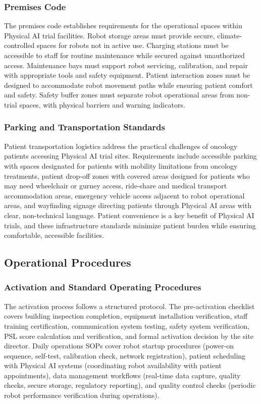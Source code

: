 \clearpage

\subsubsection{Premises Code}

The premises code establishes requirements for the operational spaces within
Physical AI trial facilities. Robot storage areas must provide secure,
climate-controlled spaces for robots not in active use. Charging stations must
be accessible to staff for routine maintenance while secured against
unauthorized access. Maintenance bays must support robot servicing, calibration,
and repair with appropriate tools and safety equipment. Patient interaction
zones must be designed to accommodate robot movement paths while ensuring
patient comfort and safety. Safety buffer zones must separate robot operational
areas from non-trial spaces, with physical barriers and warning indicators.

\subsubsection{Parking and Transportation Standards}

Patient transportation logistics address the practical challenges of oncology
patients accessing Physical AI trial sites. Requirements include accessible
parking with spaces designated for patients with mobility limitations from
oncology treatments, patient drop-off zones with covered areas designed for
patients who may need wheelchair or gurney access, ride-share and medical
transport accommodation areas, emergency vehicle access adjacent to robot
operational areas, and wayfinding signage directing patients through Physical
AI areas with clear, non-technical language. Patient convenience is a key
benefit of Physical AI trials, and these infrastructure standards minimize
patient burden while ensuring comfortable, accessible facilities.

\subsection{Operational Procedures}
\label{subsec:site-operations}

\subsubsection{Activation and Standard Operating Procedures}

The activation process follows a structured protocol. The pre-activation
checklist covers building inspection completion, equipment installation
verification, staff training certification, communication system testing, safety
system verification, PSL score calculation and verification, and formal
activation decision by the site director. Daily operations SOPs cover robot
startup procedures (power-on sequence, self-test, calibration check, network
registration), patient scheduling with Physical AI systems (coordinating robot
availability with patient appointments), data management workflows (real-time
data capture, quality checks, secure storage, regulatory reporting), and
quality control checks (periodic robot performance verification during
operations).

